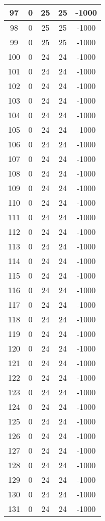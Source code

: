 \documentclass[letterpaper, 12pt]{article}
\begin{document}
\begin{longtable}{|c|c|c|c|c|}
\hline
97 & 0 & 25 & 25 & -1000 \\
\hline
98 & 0 & 25 & 25 & -1000 \\
\hline
99 & 0 & 25 & 25 & -1000 \\
\hline
100 & 0 & 24 & 24 & -1000 \\
\hline
101 & 0 & 24 & 24 & -1000 \\
\hline
102 & 0 & 24 & 24 & -1000 \\
\hline
103 & 0 & 24 & 24 & -1000 \\
\hline
104 & 0 & 24 & 24 & -1000 \\
\hline
105 & 0 & 24 & 24 & -1000 \\
\hline
106 & 0 & 24 & 24 & -1000 \\
\hline
107 & 0 & 24 & 24 & -1000 \\
\hline
108 & 0 & 24 & 24 & -1000 \\
\hline
109 & 0 & 24 & 24 & -1000 \\
\hline
110 & 0 & 24 & 24 & -1000 \\
\hline
111 & 0 & 24 & 24 & -1000 \\
\hline
112 & 0 & 24 & 24 & -1000 \\
\hline
113 & 0 & 24 & 24 & -1000 \\
\hline
114 & 0 & 24 & 24 & -1000 \\
\hline
115 & 0 & 24 & 24 & -1000 \\
\hline
116 & 0 & 24 & 24 & -1000 \\
\hline
117 & 0 & 24 & 24 & -1000 \\
\hline
118 & 0 & 24 & 24 & -1000 \\
\hline
119 & 0 & 24 & 24 & -1000 \\
\hline
120 & 0 & 24 & 24 & -1000 \\
\hline
121 & 0 & 24 & 24 & -1000 \\
\hline
122 & 0 & 24 & 24 & -1000 \\
\hline
123 & 0 & 24 & 24 & -1000 \\
\hline
124 & 0 & 24 & 24 & -1000 \\
\hline
125 & 0 & 24 & 24 & -1000 \\
\hline
126 & 0 & 24 & 24 & -1000 \\
\hline
127 & 0 & 24 & 24 & -1000 \\
\hline
128 & 0 & 24 & 24 & -1000 \\
\hline
129 & 0 & 24 & 24 & -1000 \\
\hline
130 & 0 & 24 & 24 & -1000 \\
\hline
131 & 0 & 24 & 24 & -1000 \\

\end{longtable}
\end{document}
